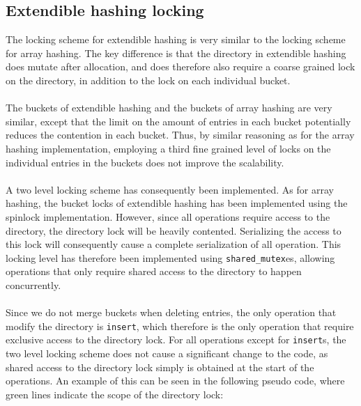 \documentclass[11pt]{report} %
\begin{document}
\subsection{Extendible hashing locking}
\label{subsec:design_extendible_hashing_locking}
The locking scheme for extendible hashing is very similar to the locking scheme for array hashing. The key difference is that the directory in extendible hashing does mutate after allocation, and does therefore also require a coarse grained lock on the directory, in addition to the lock on each individual bucket. \\
\\
The buckets of extendible hashing and the buckets of array hashing are very similar, except that the limit on the amount of entries in each bucket potentially reduces the contention in each bucket. Thus, by similar reasoning as for the array hashing implementation, employing a third fine grained level of locks on the individual entries in the buckets does not improve the scalability.\\
\\
A two level locking scheme has consequently been implemented. As for array hashing, the bucket locks of extendible hashing has been implemented using the spinlock implementation. However, since all operations require access to the directory, the directory lock will be heavily contented. Serializing the access to this lock will consequently cause a complete serialization of all operation. This locking level has therefore been implemented using \verb|shared_mutex|es, allowing operations that only require shared access to the directory to happen concurrently. \\
\\
Since we do not merge buckets when deleting entries, the only operation that modify the directory is \verb|insert|, which therefore is the only operation that require exclusive access to the directory lock. For all operations except for \verb|insert|s, the two level locking scheme does not cause a significant change to the code, as shared access to the directory lock simply is obtained at the start of the operations. An example of this can be seen in the following pseudo code, where green lines indicate the scope of the directory lock:\\
\\
\end{document}
